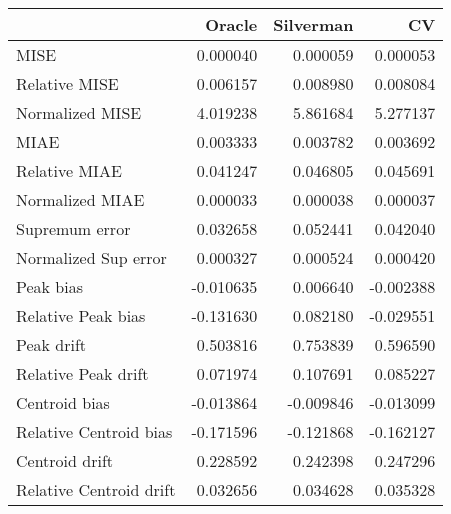 \begin{tabular}{lrrr}
  \toprule
 & Oracle & Silverman & CV \\ 
  \midrule
MISE & 0.000040 & 0.000059 & 0.000053 \\ 
  Relative MISE & 0.006157 & 0.008980 & 0.008084 \\ 
  Normalized MISE & 4.019238 & 5.861684 & 5.277137 \\ 
  MIAE & 0.003333 & 0.003782 & 0.003692 \\ 
  Relative MIAE & 0.041247 & 0.046805 & 0.045691 \\ 
  Normalized MIAE & 0.000033 & 0.000038 & 0.000037 \\ 
  Supremum error & 0.032658 & 0.052441 & 0.042040 \\ 
  Normalized Sup error & 0.000327 & 0.000524 & 0.000420 \\ 
  Peak bias & -0.010635 & 0.006640 & -0.002388 \\ 
  Relative Peak bias & -0.131630 & 0.082180 & -0.029551 \\ 
  Peak drift & 0.503816 & 0.753839 & 0.596590 \\ 
  Relative Peak drift & 0.071974 & 0.107691 & 0.085227 \\ 
  Centroid bias & -0.013864 & -0.009846 & -0.013099 \\ 
  Relative Centroid bias & -0.171596 & -0.121868 & -0.162127 \\ 
  Centroid drift & 0.228592 & 0.242398 & 0.247296 \\ 
  Relative Centroid drift & 0.032656 & 0.034628 & 0.035328 \\ 
   \bottomrule
\end{tabular}
